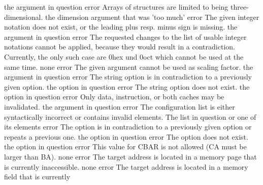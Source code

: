 \documentclass[12pt,twoside]{report}
\begin{document}
\begin{description}
               {the argument in question}
               {error}
               {Arrays of structures are limited to being three-dimensional.}
               {the dimension argument that was 'too much'}
               {error}
               {The given integer notation does not exist, or the leading plus resp.
                minus sign is missing.}
               {the argument in question}
               {error}
               {The requested changes to the list of usable integer notations cannot
                be applied, because they would result in a contradiction.  Currently,
                the only such case are 0hex und 0oct which cannot be used at the same
                time.}
               {none}
               {error}
               {The given argument cannot be used as scaling factor.}
               {the argument in question}
               {error}
               {The string option is in contradiction to a previously given option.}
               {the option in question}
               {error}
               {The string option does not exist.}
               {the option in question}
               {error}
               {Only data, instruction, or both caches may be invalidated.}
               {the argument in question}
               {error}
               {The configuration list is either syntactically incorrect or
                contains invalid elements.}
               {The list in question or one of its elements}
               {error}
               {The option is in contradiction to a previously given option or repeats a previous one.}
               {the option in question}
               {error}
               {The option does not exist.}
               {the option in question}
               {error}
               {This value for CBAR is not allowed (CA must be larger than BA).}
               {none}
               {error}
               {The target address is located in a memory page that is currently
                inaccessible.}
               {none}
               {error}
               {The target address is located in a memory field that is currently
}
\end{description}
\end{document}

